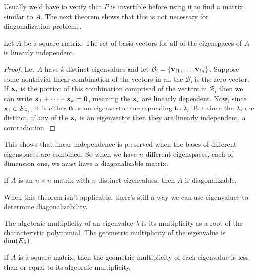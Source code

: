 \documentclass[../m073main.tex]{subfiles}
\begin{document}
Usually we'd have to verify that $P$ is invertible before using it to find a matrix similar to $A$.
The next theorem shows that this is not necessary for diagonalization problems.

\begin{theorem}
	Let $A$ be a square matrix.
	The set of basis vectors for all of the eigenspaces of $A$ is linearly independent.
\end{theorem}

\begin{proof}
	Let $A$ have $k$ distinct eigenvalues and let $\mathcal B_i = \left\{ \mathbf{v}_{i1}, \ldots, \mathbf{v}_{in} \right\}$.
	Suppose some nontrivial linear combination of the vectors in all the $\mathcal B_i$ is the zero vector.
	If $\mathbf{x}_i$ is the portion of this combination comprised of the vectors in $\mathcal B_i$ then we can write $\mathbf{x}_1 + \cdots + \mathbf{x}_k = \mathbf{0}$, meaning the $\mathbf{x}_i$ are linearly dependent.
	Now, since $\mathbf{x}_i \in E_{\lambda_i}$, it is either $\mathbf{0}$ or an eigenvector corresponding to $\lambda_i$.
	But since the $\lambda_i$ are distinct, if any of the $\mathbf{x}_i$ is an eigenvector then they are linearly independent, a contradiction.
\end{proof}

This shows that linear independence is preserved when the bases of different eigenspaces are combined.
So when we have $n$ different eigenspaces, each of dimension one, we must have a diagonalizable matrix.

\begin{theorem}
	If $A$ is an $n \times n$ matrix with $n$ distinct eigenvalues, then $A$ is diagonalizable.
\end{theorem}

When this theorem isn't applicable, there's still a way we can use eigenvalues to determine diagonalizability.

\begin{definition}
	The algebraic multiplicity of an eigenvalue $\lambda$ is its multiplicity as a root of the characteristic polynomial.
	The geometric multiplicity of the eigenvalue is $\textrm{dim} (E_\lambda)$
\end{definition}

\begin{lemma}
	If $A$ is a square matrix, then the geometric multiplicity of each eigenvalue is less than or equal to its algebraic multiplicity.
\end{lemma}
\end{document}
